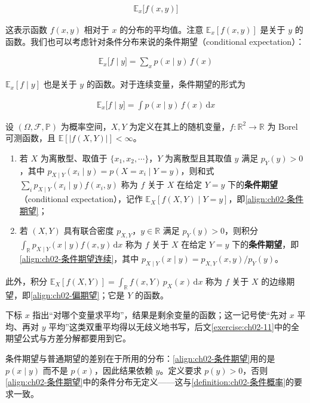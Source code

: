 \documentclass[../../main.tex]{subfiles}
\begin{document}
\begin{align}
  \mathbb{E}_{x}\big[f(x,y)\big]
  \label{align:ch02-偏期望}
\end{align}

这表示函数 $f(x,y)$ 相对于 $x$ 的分布的平均值。注意 $\mathbb{E}_{x}[f(x,y)]$ 是关于 $y$ 的函数。我们也可以考虑针对条件分布来说的条件期望（conditional expectation）：

\begin{align}
  \mathbb{E}_{x}\big[f\mid y\big] = \sum_{x} p(x\mid y)\,f(x)
  \label{align:ch02-条件期望}
\end{align}

$\mathbb{E}_{x}[f\mid y]$ 也是关于 $y$ 的函数。对于连续变量，条件期望的形式为

\begin{align}
  \mathbb{E}_{x}\big[f\mid y\big] = \int p(x\mid y)\,f(x)\,\mathrm{d}x
  \label{align:ch02-条件期望连续}
\end{align}

\begin{definition}[条件期望]\label{definition:ch02-条件期望}
设 $(\Omega,\mathcal{F},\mathbb{P})$ 为概率空间，$X,Y$ 为定义在其上的随机变量，$f:\mathbb{R}^{2}\to\mathbb{R}$ 为 Borel 可测函数，且 $\mathbb{E}[|f(X,Y)|]<\infty$。
\begin{enumerate}
  \item 若 $X$ 为离散型、取值于 $\{x_1,x_2,\cdots\}$，$Y$ 为离散型且其取值 $y$ 满足 $p_Y(y)>0$，其中 $p_{X\mid Y}(x_i\mid y)=p(X=x_i\mid Y=y)$，则和式 $\sum_{i}p_{X\mid Y}(x_i\mid y)f(x_i,y)$ 称为 $f$ 关于 $X$ 在给定 $Y=y$ 下的\textbf{条件期望}（conditional expectation），记作 $\mathbb{E}_X[f(X,Y)\mid Y=y]$，即\eqref{align:ch02-条件期望}；
  \item 若 $(X,Y)$ 具有联合密度 $p_{X,Y}$，$y\in\mathbb{R}$ 满足 $p_Y(y)>0$，则积分 $\int_{\mathbb{R}}p_{X\mid Y}(x\mid y)f(x,y)\,\mathrm{d}x$ 称为 $f$ 关于 $X$ 在给定 $Y=y$ 下的\textbf{条件期望}，即\eqref{align:ch02-条件期望连续}，其中 $p_{X\mid Y}(x\mid y)=p_{X,Y}(x,y)/p_Y(y)$。
\end{enumerate}
此外，积分 $\mathbb{E}_X[f(X,Y)]=\int_{\mathbb{R}}f(x,Y)\,p_X(x)\,\mathrm{d}x$ 称为 $f$ 关于 $X$ 的边缘期望，即\eqref{align:ch02-偏期望}；它是 $Y$ 的函数。
\end{definition}

\begin{remark}
下标 $x$ 指出“对哪个变量求平均”，结果是剩余变量的函数；这一记号使“先对 $x$ 平均、再对 $y$ 平均”这类双重平均得以无歧义地书写，后文\cref{exercise:ch02-11}中的全期望公式与方差分解都要用到它。

条件期望与普通期望的差别在于所用的分布：\eqref{align:ch02-条件期望}用的是 $p(x\mid y)$ 而不是 $p(x)$，因此结果依赖 $y$。定义要求 $p(y)>0$，否则\eqref{align:ch02-条件期望}中的条件分布无定义——这与\cref{definition:ch02-条件概率}的要求一致。
\end{remark}
\end{document}
